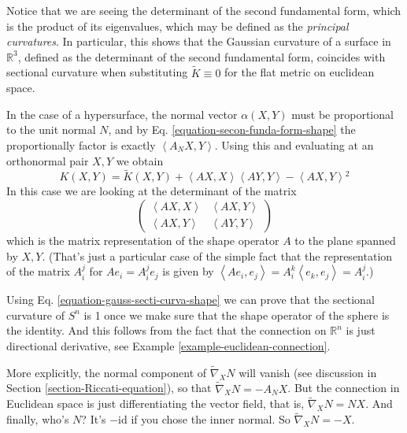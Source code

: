 Notice that we are seeing the determinant of
the second fundamental form, which
is the product of its eigenvalues, which may
be defined as the {\it principal
curvatures}. In particular, this shows that
the Gaussian curvature of a surface
in $\mathbb{R}^3$, defined as the determinant
of the second fundamental form,
coincides with sectional curvature when
substituting $\tilde{K}\equiv0$ for
 the flat metric on euclidean space.

In the case of a hypersurface, the normal
vector $\alpha(X,Y)$ must be
proportional to the unit normal $N$, and by
Eq.
\ref{equation-secon-funda-form-shape} the
proportionally
factor is exactly $\left\langle{}A_N X,Y\right\rangle{}$.
Using this and evaluating
 at an orthonormal pair $X,Y$ we obtain
\begin{equation}
\label{equation-gauss-secti-curva-shape}
K(X,Y)=\tilde{K}(X,Y)+\left\langle{}AX,
X\right\rangle{}\left\langle{}AY,Y\right\rangle{}-\left\langle{}AX,Y\right\rangle{}^2
\end{equation}
In this case we are looking at the
determinant of the matrix
\begin{equation}
\label{equation-matrix-of-shape-operator}
\begin{pmatrix}
\left\langle{}AX,X\right\rangle{}&\left\langle{}AX,Y\right\rangle{}\\
\left\langle{}AX,Y\right\rangle{}&\left\langle{}AY,Y\right\rangle{}
\end{pmatrix}
\end{equation}
which is the matrix representation of the
shape operator $A$ to the plane
spanned by $X,Y$. (That's just a particular
case of the simple fact that the
representation of the matrix $A_i^j$ for
$Ae_i=A_i^je_j$ is given by
$\left\langle{}Ae_i,e_j\right\rangle{}=A^k_i\left\langle{}e_k,
e_j\right\rangle{}=A^j_i$.)

\begin{example}
\label{example-sectional-curvature-of-sphere}
Using Eq.
\ref{equation-gauss-secti-curva-shape} we can
prove that the sectional
curvature of $S^n$ is 1 once we make sure
that the shape operator of the sphere
is the identity. And this follows from the
fact that the connection on
$\mathbb{R}^n$ is just directional
derivative, see Example
\ref{example-euclidean-connection}.

More explicitly, the normal component of
$\tilde{\nabla}_X N$ will vanish (see
discussion in Section
\ref{section-Riccati-equation}), so that
$\tilde{\nabla}_XN=-A_N X$. But the
connection in Euclidean space is just
differentiating the vector field, that is,
$\tilde{\nabla}_X N=N X$. And
finally, who's $N$? It's $-\text{id}$ if you
chose the inner normal. So
 $\tilde{\nabla}_X N=-X$.
\end{example}

